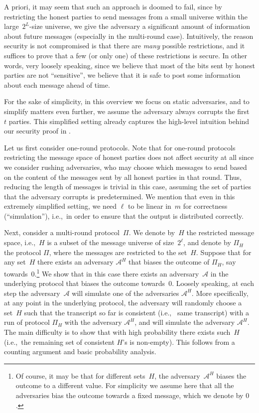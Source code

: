 \documentclass[11pt]{article}
\theoremstyle{plain}
\theoremstyle{definition}
\numberwithin{equation}{section}
\numberwithin{equation}{section} \newcommand{\aka} {also known as\ }
\newcommand{\ie}  {i.e.,\ }
\newcommand{\1}{\mathbf{1}}
\newcommand{\Adv}{\mathcal A}
\theoremstyle{remark}
\begin{document}
A priori, it may seem that such an approach is doomed to fail, since by
restricting the honest parties to send messages from a small universe within the
large~$2^L$-size universe, we give the adversary a significant amount of
information about future messages (especially in the multi-round case).
Intuitively, the reason security is not compromised is that there are {\em many}
possible restrictions, and it suffices to prove that a few (or only one) of
these restrictions is secure. In other words, very loosely speaking, since we
believe that most of the bits sent by honest parties are not ``sensitive'', we
believe that it is safe to post some information about each message ahead of
time.

For the sake of simplicity, in this overview we focus on static adversaries, and
to simplify matters even further, we assume the adversary always corrupts the
first~$t$ parties. This simplified setting already captures the high-level
intuition behind our security proof in .

Let us first consider one-round protocols. Note that for one-round protocols
restricting the message space of honest parties does not affect security at all
since we consider rushing adversaries, who may choose which messages to send
based on the content of the messages sent by all honest parties in that
round. Thus, reducing the length of messages is trivial in this case,
assuming the set of parties that the adversary corrupts is predetermined.  We
mention that even in this extremely simplified setting, we need $\ell$ to be
linear in~$m$ for correctness (``simulation''), \ie in order to ensure that the
output is distributed correctly.

Next, consider a multi-round protocol~$\Pi$.  We denote by~$H$ the restricted
message space, \ie $H$ is a subset of the message universe of size~$2^\ell$, and
denote by $\Pi_H$ the protocol $\Pi$, where the messages are restricted to the
set~$H$. Suppose that for any set~$H$ there exists an adversary $\Adv^H$ that
biases the outcome of $\Pi_H$, say towards~$0$.\footnote{Of course, it may be
  that for different sets~$H$, the adversary~$\Adv^H$ biases the outcome to a
  different value. For simplicity we assume here that all the adversaries bias
  the outcome towards a fixed message, which we denote by $0$.} We show that in
this case there exists an adversary~$\Adv$ in the underlying protocol that
biases the outcome towards~$0$.  Loosely speaking, at each step the
adversary~$\Adv$ will simulate one of the adversaries $\Adv^H$. More
specifically, at any point in the underlying protocol, the adversary will
randomly choose a set~$H$ such that the transcript so far is consistent (\ie
same transcript) with a run of protocol $\Pi_H$ with the adversary $\Adv^H$, and
will simulate the adversary $\Adv^H$.  The main difficulty is to show that with
high probability there exists such~$H$ (\ie the remaining set of consistent
$H$'s is non-empty).  This follows from a counting argument and basic
probability analysis.
\end{document}
